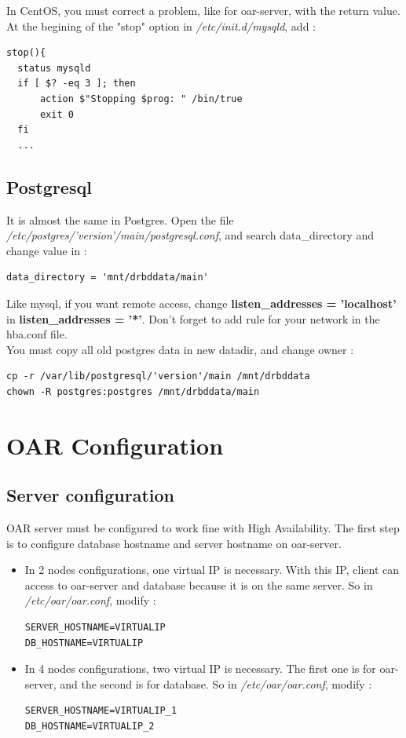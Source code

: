 \documentclass[a4paper,10pt]{report}
\begin{document}
In CentOS, you must correct a problem, like for oar-server, with the return value. At the begining of the "stop" option in \textit{/etc/init.d/mysqld}, add :
\begin{lstlisting}
stop(){
  status mysqld
  if [ $? -eq 3 ]; then
      action $"Stopping $prog: " /bin/true
      exit 0
  fi
  ...
\end{lstlisting}

\subsection{Postgresql}
It is almost the same in Postgres. Open the file \textit{/etc/postgres/'version'/main/postgresql.conf}, and search data\_directory and change value in :
\begin{lstlisting}
data_directory = 'mnt/drbddata/main'
\end{lstlisting}
Like mysql, if you want remote access, change \textbf{listen\_addresses = 'localhost'} in \textbf{listen\_addresses = '*'}. Don't forget to add rule for your network in the hba.conf file.\\
You must copy all old postgres data in new datadir, and change owner :
\begin{lstlisting}
cp -r /var/lib/postgresql/'version'/main /mnt/drbddata
chown -R postgres:postgres /mnt/drbddata/main
\end{lstlisting}



\section{OAR Configuration}
\subsection{Server configuration}
OAR server must be configured to work fine with High Availability. The first step is to configure database hostname and server hostname on oar-server.
\begin{itemize}
 \item In 2 nodes configurations, one virtual IP is necessary. With this IP, client can access to oar-server and database because it is on the same server.
So in \textit{/etc/oar/oar.conf}, modify :
\begin{lstlisting}
SERVER_HOSTNAME=VIRTUALIP
DB_HOSTNAME=VIRTUALIP
\end{lstlisting}
\item In 4 nodes configurations, two virtual IP is necessary. The first one is for oar-server, and the second is for database.
So in \textit{/etc/oar/oar.conf}, modify :
\begin{lstlisting}
SERVER_HOSTNAME=VIRTUALIP_1
DB_HOSTNAME=VIRTUALIP_2
\end{lstlisting}

\end{itemize}
\end{document}
